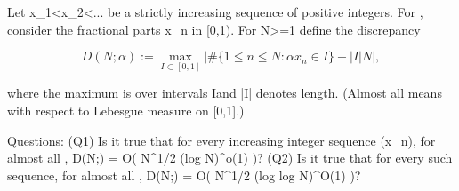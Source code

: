 Let x_1<x_2<... be a strictly increasing sequence of positive integers.
For \alpha\in[0,1], consider the fractional parts {\alpha x_n} in [0,1).
For N>=1 define the discrepancy

\[
  D(N;\alpha) := \max_{I\subset[0,1]} \left| \#\{1\le n\le N : {\alpha x_n}\in I\} - |I| N \right|,
\]

where the maximum is over intervals I\subset[0,1] and |I| denotes length.
(Almost all \alpha means with respect to Lebesgue measure on [0,1].)

Questions:
  (Q1) Is it true that for every increasing integer sequence (x_n), for almost all \alpha,
        D(N;\alpha) = O( N^{1/2} (log N)^{o(1)} )?
  (Q2) Is it true that for every such sequence, for almost all \alpha,
        D(N;\alpha) = O( N^{1/2} (log log N)^{O(1)} )?
